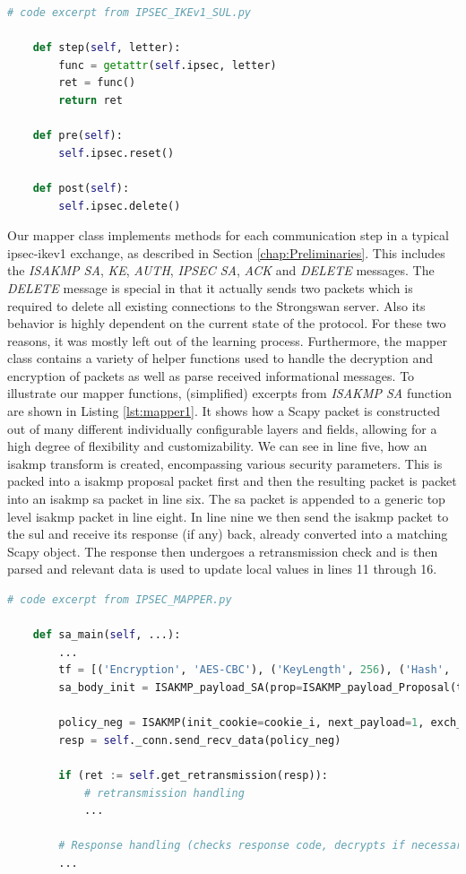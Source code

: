 \begin{lstlisting}[float=h, caption=Membership Query code, label=lst:membercode, language=python]
	# code excerpt from IPSEC_IKEv1_SUL.py
	
	def step(self, letter):
		func = getattr(self.ipsec, letter)
		ret = func()
		return ret
	
	def pre(self):
		self.ipsec.reset()
		
	def post(self):
		self.ipsec.delete()
\end{lstlisting}

Our mapper class implements methods for each communication step in a typical \ac{ipsec}-\ac{ike}v1 exchange, as described in Section \ref{chap:Preliminaries}. This includes the \emph{ISAKMP SA}, \emph{KE}, \emph{AUTH}, \emph{IPSEC SA}, \emph{ACK} and \emph{DELETE} messages. The \emph{DELETE} message is special in that it actually sends two packets which is required to delete all existing connections to the Strongswan server. Also its behavior is highly dependent on the current state of the protocol. For these two reasons, it was mostly left out of the learning process. Furthermore, the mapper class contains a variety of helper functions used to handle the decryption and encryption of packets as well as parse received informational messages. To illustrate our mapper functions, (simplified) excerpts from \emph{ISAKMP SA} function are shown in Listing \ref{lst:mapper1}. It shows how a Scapy packet is constructed out of many different individually configurable layers and fields, allowing for a high degree of flexibility and customizability. We can see in line five, how an \ac{isakmp} transform is created, encompassing various security parameters. This is packed into a \ac{isakmp} proposal packet first and then the resulting packet is packet into an \ac{isakmp} \ac{sa} packet in line six. The \ac{sa} packet is appended to a generic top level \ac{isakmp} packet in line eight. In line nine we then send the \ac{isakmp} packet to the \ac{sul} and receive its response (if any) back, already converted into a matching Scapy object. The response then undergoes a retransmission check and is then parsed and relevant data is used to update local values in lines 11 through 16.

\begin{lstlisting}[float=h, caption=Excerpt of SA Main Mapper code, label=lst:mapper1, language=python]
	# code excerpt from IPSEC_MAPPER.py
	
	def sa_main(self, ...):
		...
		tf = [('Encryption', 'AES-CBC'), ('KeyLength', 256), ('Hash', 'SHA'), ('GroupDesc', '1024MODPgr'), ('Authentication', 'PSK'), ('LifeDuration', 28800)]
		sa_body_init = ISAKMP_payload_SA(prop=ISAKMP_payload_Proposal(trans_nb=1, trans=ISAKMP_payload_Transform(num=1, transforms=tf)))
		
		policy_neg = ISAKMP(init_cookie=cookie_i, next_payload=1, exch_type=2)/sa_body_init
		resp = self._conn.send_recv_data(policy_neg)
		
		if (ret := self.get_retransmission(resp)): 
			# retransmission handling
			...
		
		# Response handling (checks response code, decrypts if necessary, updates relevant local values)
		...
\end{lstlisting}

